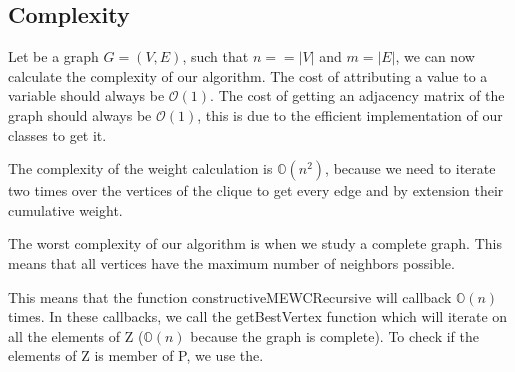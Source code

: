 
\subsection{Complexity}

Let be a graph $G = (V,E)$, such that $n = =|V|$ and $m = |E|$, we can now calculate the complexity of our algorithm. The cost of attributing a value to a variable should always be $\mathcal{O}(1)$. The cost of getting an adjacency matrix of the graph should always be $\mathcal{O}(1)$, this is due to the efficient implementation of our classes to get it.
\bigskip

The complexity of the weight calculation is $\mathbb{O}(n^2)$, because we need to iterate two times over the vertices of the clique to get every edge and by extension their cumulative weight.
\bigskip

The worst complexity of our algorithm is when we study a complete graph. This means that all vertices have the maximum number of neighbors possible.
\bigskip

This means that the function constructiveMEWCRecursive will callback $\mathbb{O}(n)$ times. In these callbacks, we call the getBestVertex function which will iterate on all the elements of Z ($\mathbb{O}(n)$ because the graph is complete). To check if the elements of Z is member of P, we use the.
